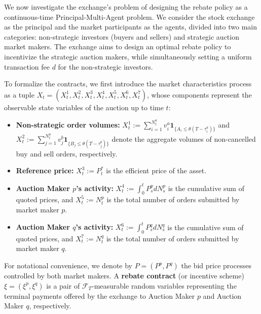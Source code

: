 \documentclass[12pt]{article}
\begin{document}
We now investigate the exchange's problem of designing the rebate policy as a continuous-time Principal-Multi-Agent problem. We consider the stock exchange as the principal and the market participants as the agents, divided into two main categories: non-strategic investors (buyers and sellers) and strategic auction market makers. The exchange aims to design an optimal rebate policy to incentivize the strategic auction makers, while simultaneously setting a uniform transaction fee $d$ for the non-strategic investors. 

To formalize the contracts, we first introduce the market characteristics process as a tuple $X_t = (X^1_t, X^2_t, X^3_t, X^{4}_t, X^{5}_t, X^{6}_t, X^{7}_t)$, whose components represent the observable state variables of the auction up to time $t$:
\begin{itemize}
    \item \textbf{Non-strategic order volumes:} 
    $X^1_t := \sum_{i=1}^{N_t^a} v^a_i \mathbf{1}_{\{A_i \leq \theta(T - \tau^a_i)\}}$ and $X^2_t := \sum_{j=1}^{N_t^b} v^b_j \mathbf{1}_{\{B_j \leq \theta(T - \tau^b_j)\}}$ denote the aggregate volumes of non-cancelled buy and sell orders, respectively.
    \item \textbf{Reference price:} 
    $X^3_t := P_t^{*}$ is the efficient price of the asset.
    \item \textbf{Auction Maker $p$'s activity:} 
    $X^4_t := \int_0^t P^p_s dN^p_s$ is the cumulative sum of quoted prices, and $X^5_t := N_t^p$ is the total number of orders submitted by market maker $p$.
    \item \textbf{Auction Maker $q$'s activity:} 
    $X^6_t := \int_0^t P^{q}_s dN^{q}_s$ is the cumulative sum of quoted prices, and $X^7_t := N_t^q$ is the total number of orders submitted by market maker $q$.
\end{itemize}
For notational convenience, we denote by $P = (P^p, P^q)$ the bid price processes controlled by both market makers.\newline 
A \textbf{rebate contract} (or incentive scheme) $\xi = (\xi^p,\xi^q)$ is a pair of $\mathcal{F}_T$-measurable random variables representing the terminal payments offered by the exchange to Auction Maker $p$ and Auction Maker $q$, respectively. 
\end{document}
